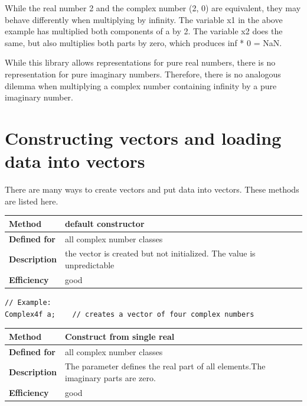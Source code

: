 \documentclass[11pt,a4paper,oneside,openright]{report}
\newcommand{\vspacesmall}{\vspace{3mm}}
\newcommand{\vspacebig}{\vspace{6mm}}
\begin{document}
While the real number 2 and the complex number (2, 0) are equivalent, they may behave differently when multiplying by infinity. The variable x1 in the above example has multiplied both components of a by 2. The variable x2 does the same, but also multiplies both parts by zero, which produces inf * 0 = NaN.
\vspacesmall

While this library allows representations for pure real numbers, there is no representation for pure imaginary numbers. Therefore, there is no analogous dilemma when multiplying a complex number containing infinity by a pure imaginary number.
\vspacesmall


\chapter{Constructing vectors and loading data into vectors} \label{ConstructingVectors}

There are many ways to create vectors and put data into vectors. These methods are listed here.
\vspacebig

\begin{tabular}{|p{25mm}|p{100mm}|}
\hline
\bfseries Method & default constructor \\ \hline
\bfseries Defined for & all complex number classes \\ \hline
\bfseries Description & the vector is created but not initialized.\newline
The value is unpredictable \\ \hline
\bfseries Efficiency & good \\ \hline
\end{tabular}
\vspacesmall

\begin{lstlisting}[frame=none]
// Example:
Complex4f a;    // creates a vector of four complex numbers
\end{lstlisting}
\vspacebig


\begin{tabular}{|p{25mm}|p{100mm}|}
\hline
\bfseries Method & Construct from single real \\ \hline
\bfseries Defined for & all complex number classes \\ \hline
\bfseries Description & The parameter defines the real part of all elements.\newline The imaginary parts are zero. \\ \hline
\bfseries Efficiency & good \\ \hline
\end{tabular}
\vspacesmall
\end{document}
